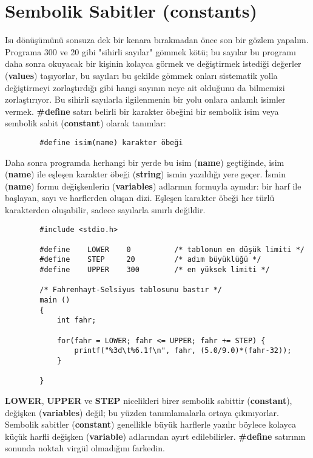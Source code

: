 \documentclass[a4paper,12pt,oneside]{book}
\begin{document}
\section{Sembolik Sabitler (constants)}

\par Isı dönüşümünü sonsuza dek bir kenara bırakmadan önce son bir gözlem yapalım. Programa 300 ve 20 gibi "sihirli sayılar" gömmek kötü; bu sayılar bu programı daha sonra okuyacak bir kişinin kolayca görmek ve değiştirmek istediği değerler (\textbf{values}) taşıyorlar, bu sayıları bu şekilde gömmek onları sistematik yolla değiştirmeyi zorlaştırdığı gibi hangi sayının neye ait olduğunu da bilmemizi zorlaştırıyor. Bu sihirli sayılarla ilgilenmenin bir yolu onlara anlamlı isimler vermek. \textbf{\#define} satırı belirli bir karakter öbeğini bir sembolik isim veya sembolik sabit (\textbf{constant}) olarak tanımlar:
\begin{lstlisting}
		#define isim(name) karakter öbeği
\end{lstlisting}
Daha sonra programda herhangi bir yerde bu isim (\textbf{name}) geçtiğinde, isim (\textbf{name}) ile eşleşen karakter öbeği (\textbf{string}) ismin yazıldığı yere geçer. İsmin (\textbf{name}) formu değişkenlerin (\textbf{variables}) adlarının formuyla aynıdır: bir harf ile başlayan, sayı ve harflerden oluşan dizi. Eşleşen karakter öbeği her türlü karakterden oluşabilir, sadece sayılarla sınırlı değildir.
\begin{lstlisting}
		#include <stdio.h>

		#define    LOWER    0          /* tablonun en düşük limiti */
		#define    STEP     20		   /* adım büyüklüğü */
		#define    UPPER    300        /* en yüksek limiti */

		/* Fahrenhayt-Selsiyus tablosunu bastır */
		main ()
		{
			int fahr;

			for(fahr = LOWER; fahr <= UPPER; fahr += STEP) {
				printf("%3d\t%6.1f\n", fahr, (5.0/9.0)*(fahr-32));
			}

		}
\end{lstlisting}

\textbf{LOWER}, \textbf{UPPER} ve \textbf{STEP} nicelikleri birer sembolik sabittir (\textbf{constant}), değişken (\textbf{variables}) değil; bu yüzden tanımlamalarla ortaya çıkmıyorlar. Sembolik sabitler (\textbf{constant}) genellikle büyük harflerle yazılır böylece kolayca küçük harfli değişken (\textbf{variable}) adlarından ayırt edilebilirler. \textbf{\#define} satırının sonunda noktalı virgül olmadığını farkedin. \pagebreak
\end{document}
